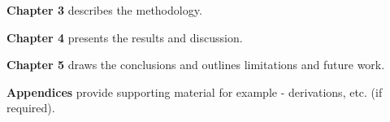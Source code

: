 \textbf{Chapter 3} describes the methodology.

\textbf{Chapter 4} presents the results and discussion.

\textbf{Chapter 5} draws the conclusions and outlines limitations and future work.

\textbf{Appendices} provide supporting material for example - derivations, etc. (if required).




